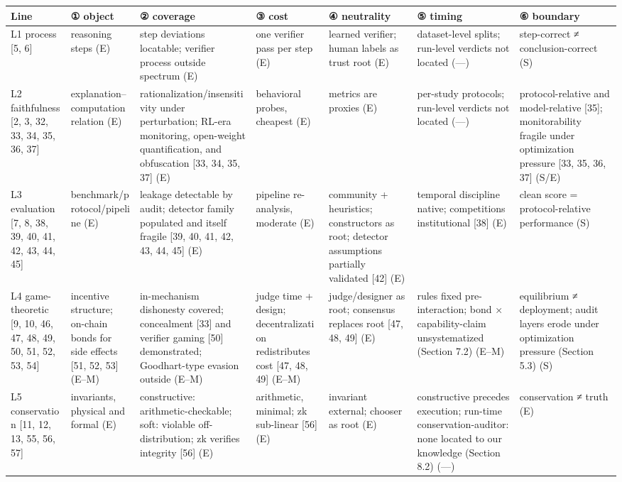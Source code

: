 \documentclass[11pt]{article}
\begin{document}
\noindent\begin{tabularx}{\textwidth}{@{}>{\raggedright\arraybackslash}p{} *{6}{>{\raggedright\arraybackslash}p{}}@{}}
\toprule
\textbf{Line} & \textbf{① object} & \textbf{② coverage} & \textbf{③ cost} & \textbf{④ neutrality} & \textbf{⑤ timing} & \textbf{⑥ boundary} \\
\midrule
L1 process [5, 6] & reasoning steps (E) & step deviations locatable; verifier process outside spectrum (E) & one verifier pass per step (E) & learned verifier; human labels as trust root (E) & dataset-level splits; run-level verdicts not located (—) & step-correct ≠ conclusion-correct (S) \\
L2 faithfulness [2, 3, 32, 33, 34, 35, 36, 37] & explanation–computation relation (E) & rationalization/\allowbreak{}insensitivity under perturbation; RL-era monitoring, open-weight quantification, and obfuscation [33, 34, 35, 37] (E) & behavioral probes, cheapest (E) & metrics are proxies (E) & per-study protocols; run-level verdicts not located (—) & protocol-relative and model-relative [35]; monitorability fragile under optimization pressure [33, 35, 36, 37] (S/E) \\
L3 evaluation [7, 8, 38, 39, 40, 41, 42, 43, 44, 45] & benchmark/\allowbreak{}protocol/\allowbreak{}pipeline (E) & leakage detectable by audit; detector family populated and itself fragile [39, 40, 41, 42, 43, 44, 45] (E) & pipeline re-analysis, moderate (E) & community + heuristics; constructors as root; detector assumptions partially validated [42] (E) & temporal discipline native; competitions institutional [38] (E) & clean score = protocol-relative performance (S) \\
L4 game-theoretic [9, 10, 46, 47, 48, 49, 50, 51, 52, 53, 54] & incentive structure; on-chain bonds for side effects [51, 52, 53] (E–M) & in-mechanism dishonesty covered; concealment [33] and verifier gaming [50] demonstrated; Goodhart-type evasion outside (E–M) & judge time + design; decentralization redistributes cost [47, 48, 49] (E–M) & judge/designer as root; consensus replaces root [47, 48, 49] (E) & rules fixed pre-interaction; bond × capability-claim unsystematized (Section 7.2) (E–M) & equilibrium ≠ deployment; audit layers erode under optimization pressure (Section 5.3) (S) \\
L5 conservation [11, 12, 13, 55, 56, 57] & invariants, physical and formal (E) & constructive: arithmetic-checkable; soft: violable off-distribution; zk verifies integrity [56] (E) & arithmetic, minimal; zk sub-linear [56] (E) & invariant external; chooser as root (E) & constructive precedes execution; run-time conservation-auditor: none located to our knowledge (Section 8.2) (—) & conservation ≠ truth (E) \\

\end{tabularx}
\end{document}

